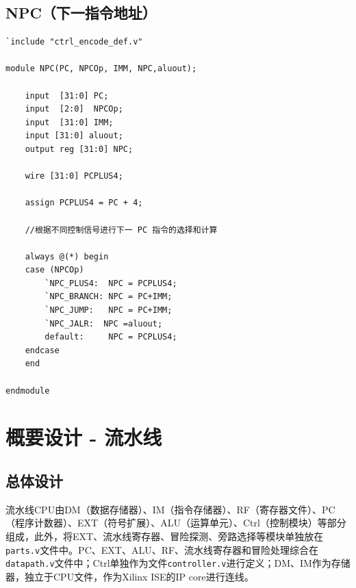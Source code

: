 \documentclass[UTF8,a4paper,autofakebold,15pt]{ctexart}
\begin{document}
\subsection{NPC（下一指令地址）}
{\lstset{language=verilog}
	\begin{lstlisting}
`include "ctrl_encode_def.v"

module NPC(PC, NPCOp, IMM, NPC,aluout);

	input  [31:0] PC;  
	input  [2:0]  NPCOp;
	input  [31:0] IMM;
	input [31:0] aluout;
	output reg [31:0] NPC;
	
	wire [31:0] PCPLUS4;
	
	assign PCPLUS4 = PC + 4;
	
	//根据不同控制信号进行下一 PC 指令的选择和计算
	
	always @(*) begin
	case (NPCOp)
		`NPC_PLUS4:  NPC = PCPLUS4;
		`NPC_BRANCH: NPC = PC+IMM;
		`NPC_JUMP:   NPC = PC+IMM;
		`NPC_JALR:	NPC =aluout;
		default:     NPC = PCPLUS4;
	endcase
	end

endmodule
\end{lstlisting}}

\section{概要设计 - 流水线}

\subsection{总体设计}

流水线CPU由DM（数据存储器）、IM（指令存储器）、RF（寄存器文件）、PC（程序计数器）、EXT（符号扩展）、ALU（运算单元）、Ctrl（控制模块）等部分组成，此外，将EXT、流水线寄存器、冒险探测、旁路选择等模块单独放在{\tt parts.v}文件中。PC、EXT、ALU、RF、流水线寄存器和冒险处理综合在{\tt datapath.v}文件中；Ctrl单独作为文件{\tt controller.v}进行定义；DM、IM作为存储器，独立于CPU文件，作为Xilinx ISE的IP core进行连线。
\end{document}
